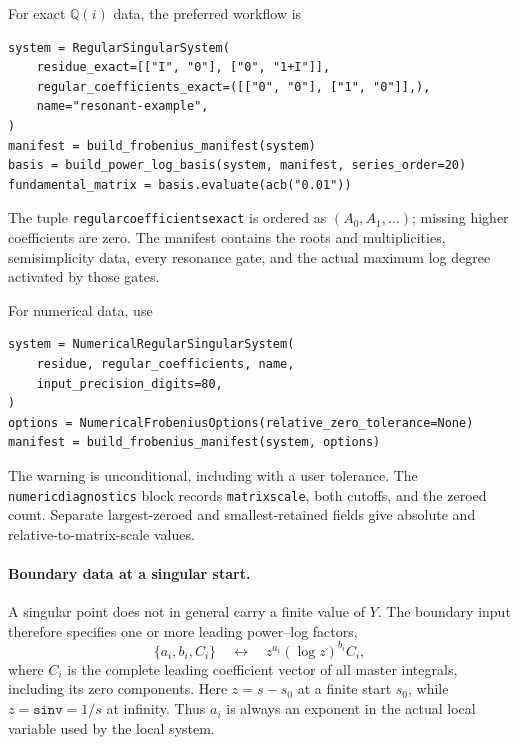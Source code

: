 \documentclass[11pt]{article}
\renewcommand{\_}{\origunderscore\allowbreak}
\begin{document}
For exact $\mathbb Q(i)$ data, the preferred workflow is
\begin{verbatim}
system = RegularSingularSystem(
    residue_exact=[["I", "0"], ["0", "1+I"]],
    regular_coefficients_exact=([["0", "0"], ["1", "0"]],),
    name="resonant-example",
)
manifest = build_frobenius_manifest(system)
basis = build_power_log_basis(system, manifest, series_order=20)
fundamental_matrix = basis.evaluate(acb("0.01"))
\end{verbatim}
The tuple \texttt{regular\_coefficients\_exact} is ordered as
$(A_0,A_1,\ldots)$; missing higher coefficients are zero.  The manifest contains the roots
and multiplicities, semisimplicity data, every resonance gate, and the actual maximum log
degree activated by those gates.

For numerical data, use
\begin{verbatim}
system = NumericalRegularSingularSystem(
    residue, regular_coefficients, name,
    input_precision_digits=80,
)
options = NumericalFrobeniusOptions(relative_zero_tolerance=None)
manifest = build_frobenius_manifest(system, options)
\end{verbatim}
The warning is unconditional, including with a user tolerance.  The
\texttt{numeric\_diagnostics} block records \texttt{matrix\_scale}, both cutoffs, and the
zeroed count.  Separate largest-zeroed and smallest-retained fields give absolute and
relative-to-matrix-scale values.

\paragraph{Boundary data at a singular start.}
\label{sec:frobenius-boundary}

A singular point does not in general carry a finite value of $Y$.  The boundary input
therefore specifies one or more leading power--log factors,
\begin{equation}
  \bigl\{a_i,b_i,C_i\bigr\}
  \quad\longleftrightarrow\quad
  z^{a_i}(\log z)^{b_i}C_i,
  \label{eq:frobenius-boundary-record}
\end{equation}
where $C_i$ is the complete leading coefficient vector of all master integrals, including
its zero components.  Here $z=s-s_0$ at a finite start $s_0$, while $z=\texttt{sinv}=1/s$
at infinity.  Thus $a_i$ is always an exponent in the actual local variable used by the
local system.
\end{document}
